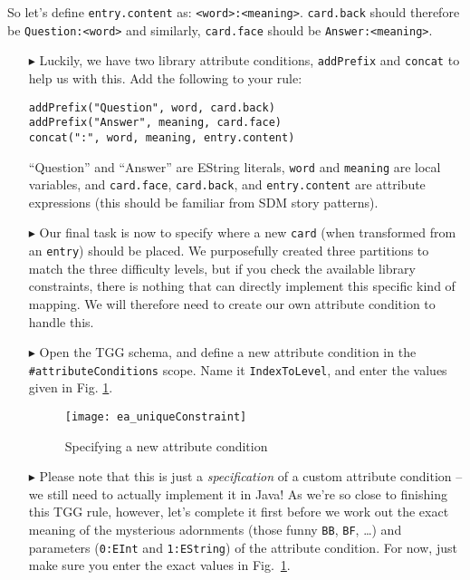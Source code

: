 So let's define \texttt{entry\-.cont\-ent} as: \texttt{<word>:<mean\-ing>}. 
\texttt{card\-.back} should therefore be \texttt{Quest\-ion:<word>} and similarly, \texttt{card\-.face} should be \texttt{Ans\-wer:<mean\-ing>}. 

\begin{enumerate}
\item[$\blacktriangleright$] Luckily, we have two library attribute conditions, \texttt{addPrefix} and \texttt{concat} to help us with this.
Add the following to your rule:

\verb|addPrefix("Question", word, card.back)|\\  
\verb|addPrefix("Answer", meaning, card.face)|\\
\verb|concat(":", word, meaning, entry.content)|

``Question'' and ``Answer'' are EString literals, \texttt{word} and \texttt{meaning} are local variables, and \texttt{card.face}, \texttt{card.back}, and \texttt{entry.content} are attribute expressions (this should be familiar from SDM story patterns).

\item[$\blacktriangleright$] Our final task is now to specify where a new \texttt{card} (when transformed from an \texttt{entry}) should be placed.  
We purposefully created three partitions to match the three difficulty levels, but if you check the available library constraints, there is nothing that can directly implement this specific kind of mapping. 
We will therefore need to create our own attribute condition to handle this.

\item[$\blacktriangleright$] Open the TGG schema, and define a new attribute condition in the \texttt{\#attributeConditions} scope. 
Name it \texttt{IndexToLevel}, and enter the values given in Fig. \ref{ea:create_new_constraint}.

\begin{figure}[htbp]
\begin{center}
  \texttt{[image: ea\_uniqueConstraint]}
  \caption{Specifying a new attribute condition}
  \label{ea:create_new_constraint}
\end{center}
\end{figure}
\FloatBarrier

\item[$\blacktriangleright$] Please note that this is just a \emph{specification} of a custom attribute condition -- we still need to actually implement it in Java! 
As we're so close to finishing this TGG rule, however, let's complete it first before we work out the exact meaning of the mysterious adornments (those funny \texttt{BB}, \texttt{BF}, \dots) and parameters (\texttt{0:EInt} and \texttt{1:EString}) of the attribute condition. 
For now, just make sure you enter the exact values in Fig.~\ref{ea:create_new_constraint}. 


\end{enumerate}
